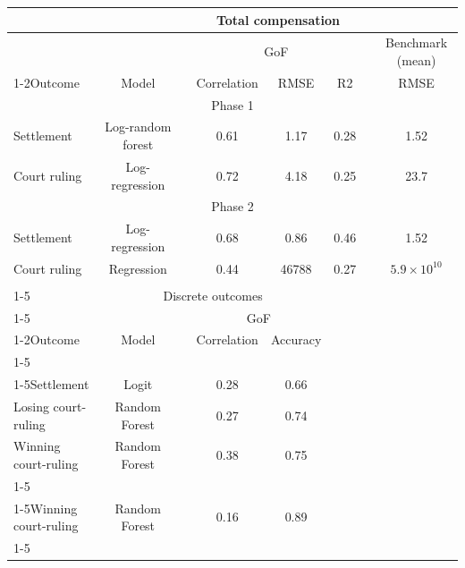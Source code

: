 \begin{tabular}{lcccccrr}
\toprule
      & \multicolumn{7}{c}{Total compensation} \\
\midrule
      &       &       & \multicolumn{3}{c}{GoF} &       & \multicolumn{1}{c}{Benchmark (mean)} \\
\cmidrule{1-2}\cmidrule{4-6}\cmidrule{8-8}Outcome & Model &       & Correlation & RMSE  & R2    &       & \multicolumn{1}{c}{RMSE} \\
\midrule
\multicolumn{8}{c}{Phase 1} \\
\midrule
\midrule
Settlement & Log-random forest &       & 0.61  & 1.17  & 0.28  &       & \multicolumn{1}{c}{1.52} \\
Court ruling & Log-regression &       & 0.72  & 4.18  & 0.25  &       & \multicolumn{1}{c}{23.7} \\
\midrule
\multicolumn{8}{c}{Phase 2} \\
\midrule
\midrule
Settlement & Log-regression &       & 0.68  & 0.86  & 0.46  &       & \multicolumn{1}{c}{1.52} \\
Court ruling & Regression &       & 0.44  & 46788 & 0.27  &       & \multicolumn{1}{c}{$5.9\times 10^{10}$} \\
\midrule
\midrule
      &       &       &       &       &       &       &  \\
\cmidrule{1-5}      & \multicolumn{4}{c}{Discrete outcomes} &       &       &  \\
\cmidrule{1-5}      &       &       & \multicolumn{2}{c}{GoF} &       &       &  \\
\cmidrule{1-2}\cmidrule{4-5}Outcome & Model &       & Correlation & Accuracy &       &       &  \\
\cmidrule{1-5}\multicolumn{5}{c}{Phase 1}           &       &       &  \\
\cmidrule{1-5}Settlement & Logit &       & 0.28  & 0.66  &       &       &  \\
Losing court-ruling & Random Forest  &       & 0.27  & 0.74  &       &       &  \\
Winning court-ruling & Random Forest  &       & 0.38  & 0.75  &       &       &  \\
\cmidrule{1-5}\multicolumn{5}{c}{Phase 2}           &       &       &  \\
\cmidrule{1-5}Winning court-ruling & Random Forest  &       & 0.16  & 0.89  &       &       &  \\
\cmidrule{1-5}\end{tabular}%
